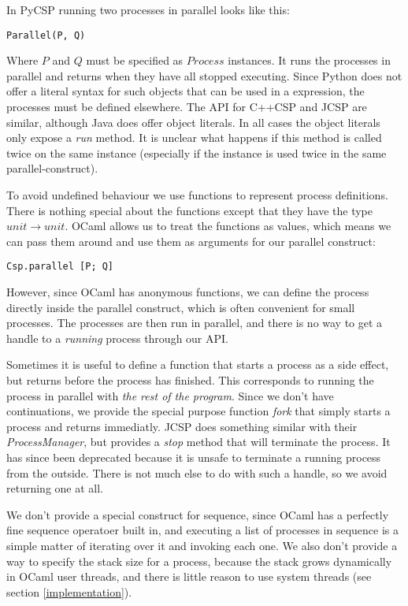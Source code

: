 \documentclass[a4paper,12pt]{article}
\begin{document}
In PyCSP running two processes in parallel looks like this:
\begin{verbatim}
Parallel(P, Q)
\end{verbatim}
Where $P$ and $Q$ must be specified as $Process$ instances. It runs the processes in
parallel and returns when they have all stopped executing. Since Python does not offer
a literal syntax for such objects that can be used in a expression, the processes must
be defined elsewhere. The API for C++CSP and JCSP are similar, although Java does offer
object literals. In all cases the object literals only expose a \emph{run} method. 
It is unclear what happens if this method is called twice on the same instance 
(especially if the instance is used twice in the same parallel-construct).

To avoid undefined behaviour we use functions to represent process definitions. There is 
nothing special about the functions except that they have the type $unit \to unit$. OCaml 
allows us to treat the functions as values, which means we can pass them around and use 
them as arguments for our parallel construct:

\begin{verbatim}
Csp.parallel [P; Q]
\end{verbatim}

However, since OCaml has anonymous functions, we can define the process directly inside
the parallel construct, which is often convenient for small processes. The processes
are then run in parallel, and there is no way to get a handle to a \emph{running} process
through our API.

Sometimes it is useful to define a function that starts a process as a side effect, but
returns before the process has finished. This corresponds to running the process in 
parallel with \emph{the rest of the program}. Since we don't have continuations, we 
provide the special purpose function \emph{fork} that simply starts a process and returns
immediatly. JCSP does something similar with their \emph{ProcessManager}, but provides a
\emph{stop} method that will terminate the process. It has since been deprecated because
it is unsafe to terminate a running process from the outside. There is not much else to 
do with such a handle, so we avoid returning one at all.

We don't provide a special construct for sequence, since OCaml has a perfectly fine 
sequence operatoer built in, and executing a list of processes in sequence is a simple
matter of iterating over it and invoking each one. We also don't provide a way to specify 
the stack size for a process, because the stack grows dynamically in OCaml user threads, 
and there is little reason to use system threads (see section \ref{implementation}).
\end{document}
